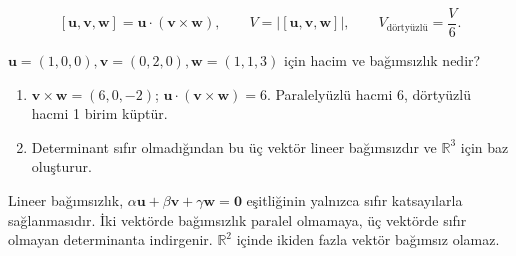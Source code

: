 {\small\[
[\mathbf u,\mathbf v,\mathbf w]=\mathbf u\cdot(\mathbf v\times\mathbf w),\qquad V=|[\mathbf u,\mathbf v,\mathbf w]|,\qquad V_{\text{dörtyüzlü}}=\frac{V}{6}.
\]}
\begin{tcolorbox}[title={Örnek 1.5 | Hacim ve bağımsızlık},colframe=accent]\(\mathbf u=(1,0,0),\mathbf v=(0,2,0),\mathbf w=(1,1,3)\) için hacim ve bağımsızlık nedir?
\par\vspace{1mm}{\scriptsize\sffamily Pekiştirme}\end{tcolorbox}
\begin{tcolorbox}[title={Adım adım çözüm},colback=green!3!white,colframe=green]\begin{enumerate}
\item \(\mathbf v\times\mathbf w=(6,0,-2)\); \(\mathbf u\cdot(\mathbf v\times\mathbf w)=6\). Paralelyüzlü hacmi 6, dörtyüzlü hacmi 1 birim küptür.
\item Determinant sıfır olmadığından bu üç vektör lineer bağımsızdır ve \(\mathbb R^3\) için baz oluşturur.
\end{enumerate}\end{tcolorbox}
Lineer bağımsızlık, \(\alpha\mathbf u+\beta\mathbf v+\gamma\mathbf w=\mathbf0\) eşitliğinin yalnızca sıfır katsayılarla sağlanmasıdır. İki vektörde bağımsızlık paralel olmamaya, üç vektörde sıfır olmayan determinanta indirgenir. \(\mathbb R^2\) içinde ikiden fazla vektör bağımsız olamaz.


